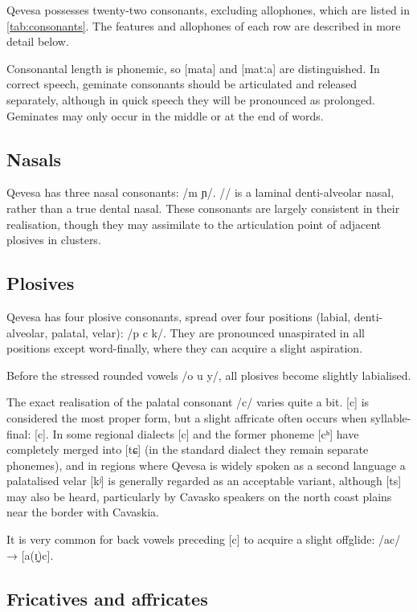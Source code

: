 \documentclass[grammar]{subfiles}
\begin{document}
Qevesa possesses twenty-two consonants, excluding allophones, which are
listed in \cref{tab:consonants}.  The features and allophones of each row are
described in more detail below.

Consonantal length is phonemic, so [mata] and [matːa] are distinguished.  In
correct speech, geminate consonants should be articulated and released
separately, although in quick speech they will be pronounced as prolonged.
Geminates may only occur in the middle or at the end of words.


\subsection{Nasals}
\label{ssec:nasals}

Qevesa has three nasal consonants: /m  ɲ/.  // is a laminal
denti-alveolar nasal, rather than a true dental nasal.  These consonants are
largely consistent in their realisation, though they may assimilate to the
articulation point of adjacent plosives in clusters. 


\subsection{Plosives}
\label{ssec:plosives}

Qevesa has four plosive consonants, spread over four positions (labial,
denti-alveolar, palatal, velar): /p  c k/.  They are pronounced
unaspirated in all positions except word-finally, where they can acquire
a slight aspiration.

Before the stressed rounded vowels /o u y/, all plosives become slightly
labialised.

The exact realisation of the palatal consonant /c/ varies quite a bit.  [c] is
considered the most proper form, but a slight affricate often occurs when
syllable-final: [c].  In some regional dialects [c] and the former
phoneme [cʰ] have completely merged into [tɕ] (in the standard dialect they
remain separate phonemes), and in regions where Qevesa is widely spoken as a
second language a palatalised velar [kʲ] is generally regarded as an acceptable
variant, although [ts] may also be heard, particularly by Cavasko speakers
on the north coast plains near the border with Cavaskia.

It is very common for back vowels preceding [c] to acquire a slight offglide:
/ac/ → [a(ɪ̯)c].


\subsection{Fricatives and affricates}
\label{ssec:fricatives}
\end{document}
